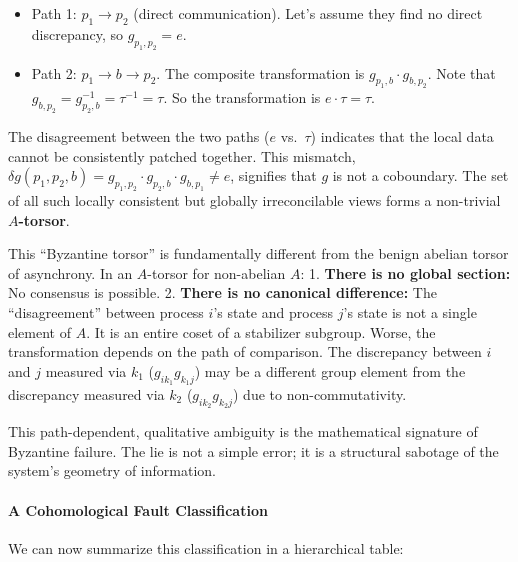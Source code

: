 \documentclass[
]{article}
\providecommand{\tightlist}{%
  \setlength{\itemsep}{0pt}\setlength{\parskip}{0pt}}
\begin{document}
\begin{itemize}
\tightlist
\item
  Path 1: \(p_1 \to p_2\) (direct communication). Let's assume they find
  no direct discrepancy, so \(g_{p_1, p_2} = e\).
\item
  Path 2: \(p_1 \to b \to p_2\). The composite transformation is
  \(g_{p_1, b} \cdot g_{b, p_2}\). Note that
  \(g_{b, p_2} = g_{p_2, b}^{-1} = \tau^{-1} = \tau\). So the
  transformation is \(e \cdot \tau = \tau\).
\end{itemize}

The disagreement between the two paths (\(e\) vs.~\(\tau\)) indicates
that the local data cannot be consistently patched together. This
mismatch,
\(\delta g(p_1, p_2, b) = g_{p_1, p_2} \cdot g_{p_2, b} \cdot g_{b, p_1} \neq e\),
signifies that \(g\) is not a coboundary. The set of all such locally
consistent but globally irreconcilable views forms a non-trivial
\textbf{\(A\)-torsor}.

This ``Byzantine torsor'' is fundamentally different from the benign
abelian torsor of asynchrony. In an \(A\)-torsor for non-abelian \(A\):
1. \textbf{There is no global section:} No consensus is possible. 2.
\textbf{There is no canonical difference:} The ``disagreement'' between
process \(i\)'s state and process \(j\)'s state is not a single element
of \(A\). It is an entire coset of a stabilizer subgroup. Worse, the
transformation depends on the path of comparison. The discrepancy
between \(i\) and \(j\) measured via \(k_1\) (\(g_{ik_1}g_{k_1j}\)) may
be a different group element from the discrepancy measured via \(k_2\)
(\(g_{ik_2}g_{k_2j}\)) due to non-commutativity.

This path-dependent, qualitative ambiguity is the mathematical signature
of Byzantine failure. The lie is not a simple error; it is a structural
sabotage of the system's geometry of information.

\paragraph{A Cohomological Fault
Classification}\label{a-cohomological-fault-classification}

We can now summarize this classification in a hierarchical table:
\end{document}

